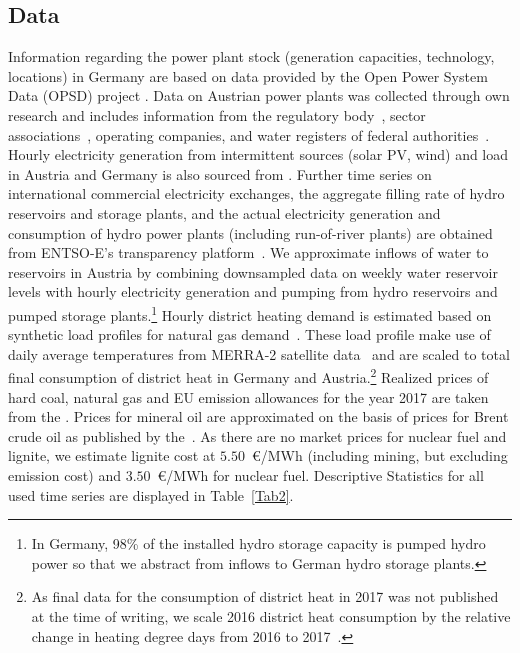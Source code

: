 \documentclass[preprint, 12pt, authoryear]{elsarticle}
\begin{document}
\subsection{Data}
Information regarding the power plant stock (generation capacities, technology, locations) in Germany are based on data provided by the Open Power System Data (OPSD) project \citep{OPSD2018a}.
Data on Austrian power plants was collected through own research and includes information from the regulatory body~\citep{EControl2003}, sector associations~\citep{OeEn2017}, operating companies, and water registers of federal authorities~\citep{LandVorarlberg2018, LandTirol2018}.
Hourly electricity generation from intermittent sources (solar PV, wind) and load in Austria and Germany is also sourced from \citet{OPSD2018b}. 
Further time series on international commercial electricity exchanges, the aggregate filling rate of hydro reservoirs and storage plants, and the actual electricity generation and consumption of hydro power plants (including run-of-river plants) are obtained from ENTSO-E's transparency platform~\citep{ENTSOE2018}.
We approximate inflows of water to reservoirs in Austria by combining downsampled data on weekly water reservoir levels with hourly electricity generation and pumping from hydro reservoirs and pumped storage plants.\footnote{In Germany, 98\% of the installed hydro storage capacity is pumped hydro power so that we abstract from inflows to German hydro storage plants.}
Hourly district heating demand is estimated based on synthetic load profiles for natural gas demand~\citep{Almbauer2009}.
These load profile make use of daily average temperatures from MERRA-2 satellite data~\citep{GMAO2015} and are scaled to total final consumption of district heat in Germany and Austria.\footnote{As final data for the consumption of district heat in 2017 was not published at the time of writing, we scale 2016 district heat consumption by the relative change in heating degree days from 2016 to 2017~\citep{AGEB2018a, OeStat2018}.}
Realized prices of hard coal, natural gas and EU emission allowances for the year 2017 are taken from the \citet{EEX2019}.
Prices for mineral oil are approximated on the basis of prices for Brent crude oil as published by the~\citet{EIA2018}.
As there are no market prices for nuclear fuel and lignite, we estimate lignite cost at $5.50$~\euro{}/MWh (including mining, but excluding emission cost) and $3.50$~\euro{}/MWh for nuclear fuel.
Descriptive Statistics for all used time series are displayed in Table~\ref{Tab2}.
\end{document}
